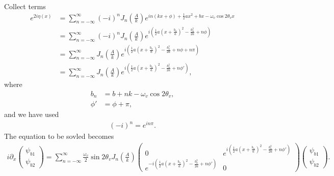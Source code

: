 \documentclass[letterpaper,12pt,english]{sphinxmanual}
\begin{document}
Collect terms
\begin{equation*}
\begin{split}e^{2i\eta(x)} &= \sum_{n=-\infty}^{\infty} (-i)^n J_n\left(\frac{A}{k}\right) e^{in(kx+\phi) + \frac{1}{2}ax^2 +bx - \omega_v \cos 2\theta_v x } \\
&=  \sum_{n=-\infty}^{\infty} (-i)^n J_n\left(\frac{A}{k}\right) e^{ i \left( \frac{1}{2} a \left( x + \frac{b_n}{a} \right)^2 - \frac{b_n^2}{2a} + n\phi \right) } \\
& = \sum_{n=-\infty}^{\infty} J_n\left(\frac{A}{k}\right) e^{ i \left( \frac{1}{2} a \left( x + \frac{b_n}{a} \right)^2 - \frac{b_n^2}{2a} + n\phi + n\pi \right) } \\
& = \sum_{n=-\infty}^{\infty} J_n\left(\frac{A}{k}\right) e^{ i \left( \frac{1}{2} a \left( x + \frac{b_n}{a} \right)^2 - \frac{b_n^2}{2a} + n\phi' \right) }  ,\end{split}
\end{equation*}
where
\begin{equation*}
\begin{split}b_n &= b + nk - \omega_v \cos 2\theta_v,\\
\phi'&= \phi + \pi,\end{split}
\end{equation*}
and we have used
\begin{equation*}
\begin{split}(-i)^n = e^{i n\pi}.\end{split}
\end{equation*}
The equation to be sovled becomes
\begin{equation*}
\begin{split}i\partial_x \begin{pmatrix}
\psi_{b1}\\
\psi_{b2}
\end{pmatrix} =   \sum_{n=-\infty}^\infty \frac{\omega_v}{2}\sin 2\theta_v  J_n\left( \frac{A}{k} \right) \begin{pmatrix}
0 & e^{i\left( \frac{1}{2} a \left( x + \frac{b_n}{a} \right)^2 - \frac{b_n^2}{2a} + n\phi' \right) } \\
e^{-i\left( \frac{1}{2} a \left( x + \frac{b_n}{a} \right)^2 - \frac{b_n^2}{2a} + n\phi' \right)} & 0
\end{pmatrix}\begin{pmatrix}
\psi_{b1}\\
\psi_{b2}
\end{pmatrix}.\end{split}
\end{equation*}
\end{document}
